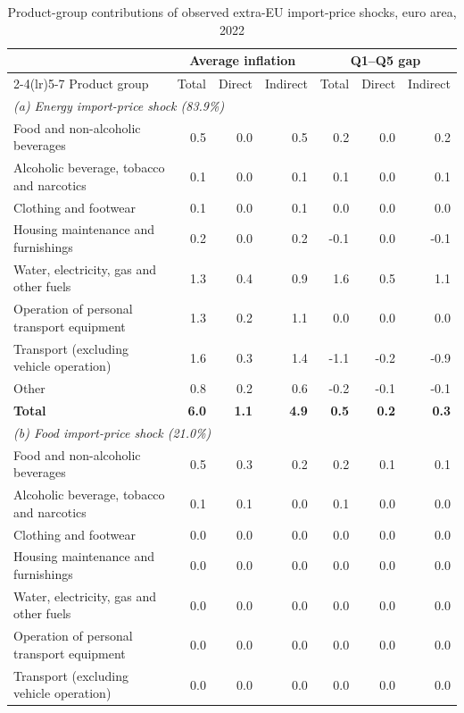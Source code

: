 \begin{table}[H]

\caption{\label{tab:shock-oil-gas-chain-ea20}Product-group contributions of observed extra-EU import-price shocks, euro area, 2022}
\centering
\small
\setlength{\tabcolsep}{3.0pt}
\begin{tabularx}{\textwidth}{Xrrrrrr}
\toprule
 & \multicolumn{3}{c}{Average inflation} & \multicolumn{3}{c}{Q1--Q5 gap}\\
\cmidrule(lr){2-4}\cmidrule(lr){5-7}
Product group & Total & Direct & Indirect & Total & Direct & Indirect\\
\midrule
\multicolumn{7}{l}{\textit{(a) Energy import-price shock (83.9\%)}}\\
Food and non-alcoholic beverages & 0.5 & 0.0 & 0.5 & 0.2 & 0.0 & 0.2\\
Alcoholic beverage, tobacco and narcotics & 0.1 & 0.0 & 0.1 & 0.1 & 0.0 & 0.1\\
Clothing and footwear & 0.1 & 0.0 & 0.1 & 0.0 & 0.0 & 0.0\\
Housing maintenance and furnishings & 0.2 & 0.0 & 0.2 & -0.1 & 0.0 & -0.1\\
Water, electricity, gas and other fuels & 1.3 & 0.4 & 0.9 & 1.6 & 0.5 & 1.1\\
Operation of personal transport equipment & 1.3 & 0.2 & 1.1 & 0.0 & 0.0 & 0.0\\
Transport (excluding vehicle operation) & 1.6 & 0.3 & 1.4 & -1.1 & -0.2 & -0.9\\
Other & 0.8 & 0.2 & 0.6 & -0.2 & -0.1 & -0.1\\
\textbf{Total} & \textbf{6.0} & \textbf{1.1} & \textbf{4.9} & \textbf{0.5} & \textbf{0.2} & \textbf{0.3}\\
\midrule
\multicolumn{7}{l}{\textit{(b) Food import-price shock (21.0\%)}}\\
Food and non-alcoholic beverages & 0.5 & 0.3 & 0.2 & 0.2 & 0.1 & 0.1\\
Alcoholic beverage, tobacco and narcotics & 0.1 & 0.1 & 0.0 & 0.1 & 0.0 & 0.0\\
Clothing and footwear & 0.0 & 0.0 & 0.0 & 0.0 & 0.0 & 0.0\\
Housing maintenance and furnishings & 0.0 & 0.0 & 0.0 & 0.0 & 0.0 & 0.0\\
Water, electricity, gas and other fuels & 0.0 & 0.0 & 0.0 & 0.0 & 0.0 & 0.0\\
Operation of personal transport equipment & 0.0 & 0.0 & 0.0 & 0.0 & 0.0 & 0.0\\
Transport (excluding vehicle operation) & 0.0 & 0.0 & 0.0 & 0.0 & 0.0 & 0.0\\

\end{tabularx}
\end{table}
